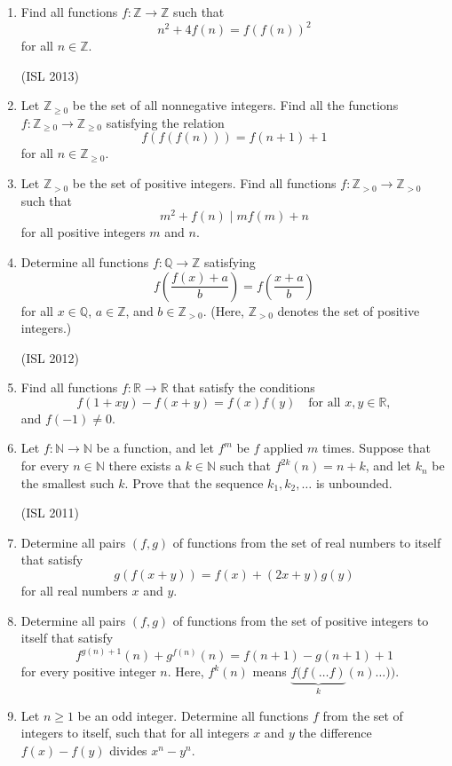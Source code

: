 \documentclass[11pt,a4paper]{article}
\begin{document}
\begin{enumerate}
\item Find all functions $f : \mathbb{Z} \to\mathbb{ Z}$ such that
\[ n^2+4f(n)=f(f(n))^2 \]
for all $n\in \mathbb{Z}$.

(ISL 2013)
\item Let $\mathbb{Z}_{\ge 0}$ be the set of all nonnegative integers. Find all the functions $f: \mathbb{Z}_{\ge 0} \rightarrow \mathbb{Z}_{\ge 0} $ satisfying the relation
\[ f(f(f(n))) = f(n+1 ) +1 \]
for all $ n\in \mathbb{Z}_{\ge 0}$.

\item Let $\mathbb{Z} _{>0}$ be the set of positive integers. Find all functions $f: \mathbb{Z} _{>0}\rightarrow \mathbb{Z} _{>0}$ such that
\[ m^2 + f(n) \mid mf(m) +n \]
for all positive integers $m$ and $n$.

\item Determine all functions $f: \mathbb{Q} \rightarrow \mathbb{Z} $ satisfying
\[ f \left( \frac{f(x)+a} {b}\right) = f \left( \frac{x+a}{b} \right) \]
for all $x \in \mathbb{Q}$, $a \in \mathbb{Z}$, and $b \in \mathbb{Z}_{>0}$. (Here, $\mathbb{Z}_{>0}$ denotes the set of positive integers.)

(ISL 2012)
\item Find all functions $f:\mathbb{R} \rightarrow \mathbb{R}$ that satisfy the conditions
\[f(1+xy)-f(x+y)=f(x)f(y) \quad \text{for all } x,y \in \mathbb{R},\]
and $f(-1) \neq 0$.

\item Let $f: \mathbb{N} \rightarrow \mathbb{N}$ be a function, and let $f^m$ be $f$ applied $m$ times. Suppose that for every $n \in \mathbb{N}$ there exists a $k \in \mathbb{N}$ such that $f^{2k}(n)=n+k$, and let $k_n$ be the smallest such $k$. Prove that the sequence $k_1,k_2,\ldots $ is unbounded.

(ISL 2011)
\item Determine all pairs $(f,g)$ of functions from the set of real numbers to itself that satisfy \[g(f(x+y)) = f(x) + (2x + y)g(y)\] for all real numbers $x$ and $y$.

\item Determine all pairs $(f,g)$ of functions from the set of positive integers to itself that satisfy \[f^{g(n)+1}(n) + g^{f(n)}(n) = f(n+1) - g(n+1) + 1\] for every positive integer $n$. Here, $f^k(n)$ means $\underbrace{f(f(\ldots f)}_{k}(n) \ldots ))$.

\item Let $n \geq 1$ be an odd integer. Determine all functions $f$ from the set of integers to itself, such that for all integers $x$ and $y$ the difference $f(x)-f(y)$ divides $x^n-y^n.$


\end{enumerate}
\end{document}
